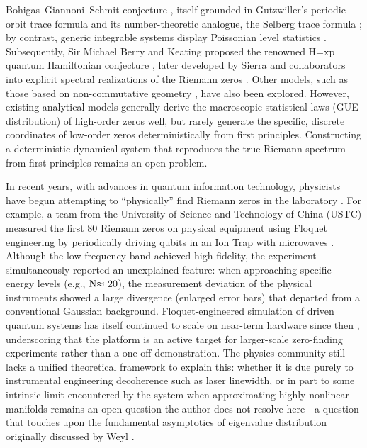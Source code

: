 \documentclass[mca,article,submit,oneauthor,pdftex]{Definitions/mdpi}
\begin{document}
Bohigas--Giannoni--Schmit conjecture \cite{bohigas1984}, itself grounded in
Gutzwiller's periodic-orbit trace formula \cite{gutzwiller1971} and its
number-theoretic analogue, the Selberg trace formula \cite{selberg1956}; by
contrast, generic integrable systems display Poissonian level statistics
\cite{berrytabor1977}. Subsequently, Sir Michael Berry and
Keating proposed the renowned \(\text{H}\text{=}\text{xp}\) quantum
Hamiltonian conjecture \cite{berry1999}, later developed by Sierra and
collaborators into explicit spectral realizations of the Riemann zeros
\cite{sierra2009,sierrarodriguez2011}. Other models, such as those based on
non-commutative geometry \cite{connes1999}, have also been explored. However,
existing analytical models generally derive the
macroscopic statistical laws (GUE distribution) of high-order zeros well, but
rarely generate the specific, discrete
coordinates of low-order zeros deterministically from first principles.
Constructing a deterministic dynamical system that reproduces the
true Riemann spectrum from first principles remains an open problem.

In recent years, with advances in quantum information technology,
physicists have begun attempting to ``physically'' find Riemann zeros in
the laboratory \cite{he2020}. For example, a team from the University of Science and
Technology of China (USTC) measured the first 80 Riemann
zeros on physical equipment using Floquet engineering by periodically
driving qubits in an Ion Trap with microwaves \cite{he2021}. Although the
low-frequency band achieved high fidelity, the experiment
simultaneously reported an unexplained feature: when approaching
specific energy levels (e.g., \(\text{N} \text{\ensuremath{\approx} 20}\)), the measurement
deviation of the physical instruments showed a large divergence
(enlarged error bars) that departed from a conventional Gaussian background.
Floquet-engineered simulation of driven quantum systems has itself continued
to scale on near-term hardware since then \cite{eckstein2024}, underscoring
that the platform is an active target for larger-scale zero-finding
experiments rather than a one-off demonstration. The physics community still lacks a unified theoretical framework to
explain this: whether it is due purely to instrumental engineering
decoherence such as laser linewidth, or in part to some intrinsic limit
encountered by the system when approximating highly nonlinear
manifolds remains an open question the author does not resolve here---a question
that touches upon the fundamental asymptotics of
eigenvalue distribution originally discussed by Weyl \cite{weyl1912}.
\end{document}
